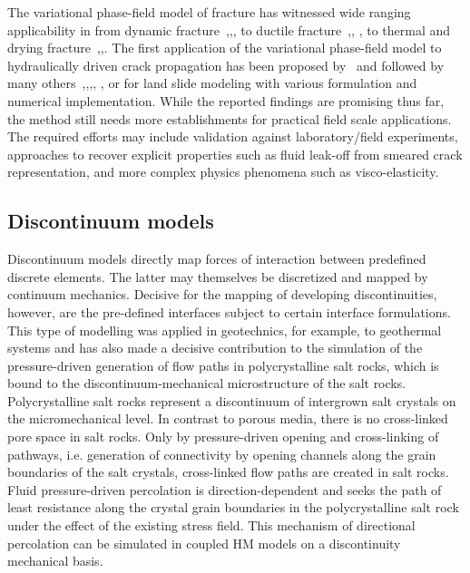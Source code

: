 The variational phase-field model of fracture has witnessed wide ranging applicability in from dynamic fracture~\cite{Bourdin2011},\cite{Borden2012},\cite{Li2016}, to ductile fracture~\cite{Ambati2015},\cite{Miehe2015486}, \cite{Alessi2017}, to thermal and drying fracture~\cite{Maurini2013},\cite{Bourdin2014},\cite{Miehe2015_thermo}. 
The first application of the variational phase-field model to hydraulically driven crack propagation has been proposed by~\cite{Bourdin2012} and followed by many others~\cite{Wheeler2014},\cite{Wilson2016},\cite{Heider201738},\cite{Santillan2017},
\cite{Chukwudozie2019957},
\cite{Li201942} 
or for land slide modeling \cite{Wei2020} 
with various formulation and numerical implementation. 
While the reported findings are promising thus far, the method still needs more establishments for practical field scale applications. 
The required efforts may include validation against laboratory/field experiments, approaches to recover explicit properties such as fluid leak-off from smeared crack representation, and more complex physics phenomena such as visco-elasticity.

\subsection{Discontinuum models}

Discontinuum models directly map forces of interaction between predefined discrete elements. The latter may themselves be discretized and mapped by continuum mechanics. Decisive for the mapping of developing discontinuities, however, are the pre-defined interfaces subject to certain interface formulations. This type of modelling was applied in geotechnics, for example, to geothermal systems \cite{Zeeb2015264} and has also made a decisive contribution to the simulation of the pressure-driven generation of flow paths in polycrystalline salt rocks, which is bound to the discontinuum-mechanical microstructure of the salt rocks. Polycrystalline salt rocks represent a discontinuum of intergrown salt crystals on the micromechanical level. In contrast to porous media, there is no cross-linked pore space in salt rocks. Only by pressure-driven opening and cross-linking of pathways, i.e. generation of connectivity by opening channels along the grain boundaries of the salt crystals, cross-linked flow paths are created in salt rocks. Fluid pressure-driven percolation is direction-dependent and seeks the path of least resistance along the crystal grain boundaries in the polycrystalline salt rock under the effect of the existing stress field. This mechanism of directional percolation can be simulated in coupled HM models on a discontinuity mechanical basis.

